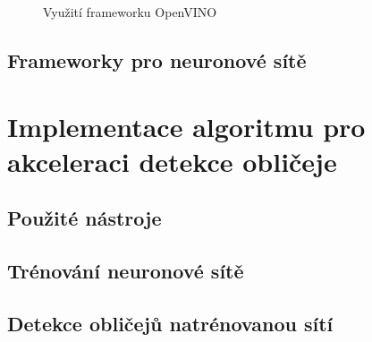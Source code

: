 \begin{figure}[H]
  \begin{center}
  \label{obrazek:ovchart}
  \caption{Využití frameworku OpenVINO \cite{openvino}}
  \end{center}
\end{figure}


\section{Frameworky pro neuronové sítě}
\label{sekce:frameworky_pro_ns}





\chapter{Implementace algoritmu pro akceleraci detekce obličeje}
\label{kapitola:implementace}


\section{Použité nástroje}


\section{Trénování neuronové sítě}


\section{Detekce obličejů natrénovanou sítí}



